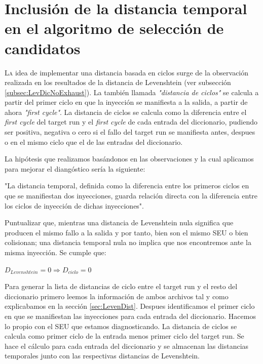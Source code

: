 \chapter{Inclusión de la distancia temporal en el algoritmo de selección de
candidatos}
\label{ch:Cycle}

\lettrine[lraise=-0.1, lines=2, loversize=0.2]{L}{a} idea de implementar una
distancia basada en ciclos surge de la observación realizada en los resultados de
la distancia de Levenshtein (ver subsección \ref{subsec:LevDicNoExhaust}). La
también llamada \textit{"distancia de ciclos"} se calcula a partir del primer 
ciclo en que la inyección se manifiesta a la salida, a partir de ahora 
\textit{"first cycle"}. La distancia de ciclos se calcula como la diferencia 
entre el \textit{first cycle} del target run y el \textit{first cycle} de cada 
entrada del diccionario, pudiendo ser positiva, negativa o cero si el fallo del 
target run se manifiesta antes, despues o en el mismo ciclo que el de las 
entradas del diccionario.

La hipótesis que realizamos basándonos en las observaciones y la cual aplicamos
para mejorar el diangóstico sería la siguiente:
\begin{hypothesis}\label{hyp:cycle}
    "La distancia temporal, definida como la diferencia entre los primeros ciclos
    en que se manifiestan dos inyecciones, guarda relación directa con la
    diferencia entre los ciclos de inyección de dichas inyecciones".
\end{hypothesis}

Puntualizar que, mientras una distancia de Levenshtein nula significa que 
producen el mismo fallo a la salida y por tanto, bien son el mismo \gls{SEU} o 
bien colisionan; una distancia temporal nula no implica que nos encontremos ante
la misma inyección. Se cumple que:
\begin{center}
    $D_{Levenshtein} = 0 \Rightarrow D_{ciclo} = 0$
\end{center}

Para generar la lista de distancias de ciclo entre el target run y el resto del
diccionario primero leemos la información de ambos archivos tal y como
explicabamos en la sección \ref{sec:LevenDist}. Despues identificamos el primer
ciclo en que se manifiestan las inyecciones para cada entrada del diccionario.
Hacemos lo propio con el \gls{SEU} que estamos diagnosticando. La distancia de
ciclos se calcula como primer ciclo de la entrada menos primer ciclo del target
run. Se hace el cálculo para cada entrada del diccionario y se almacenan las
distancias temporales junto con las respectivas distancias de Levenshtein.

